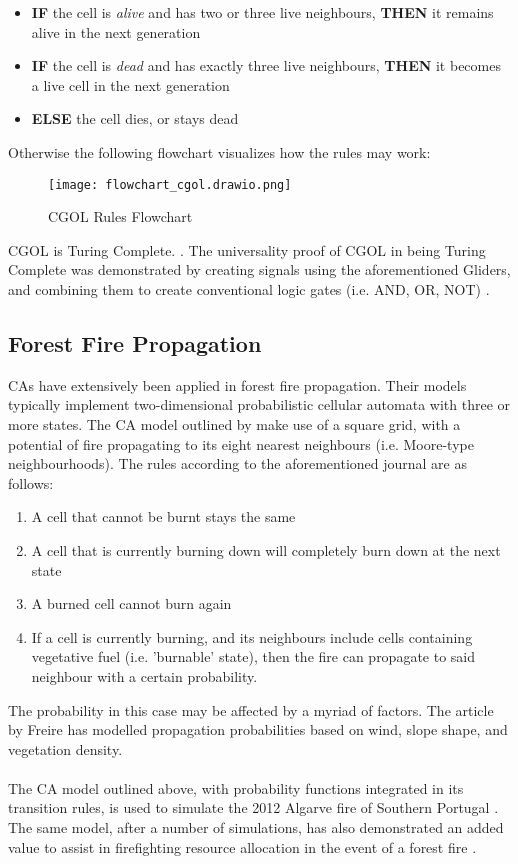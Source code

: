 \begin{itemize}
    \item \textbf{IF} the cell is \textit{alive} and has two or three live neighbours, \textbf{THEN} it remains alive in the next generation
    \item \textbf{IF} the cell is \textit{dead} and has exactly three live neighbours, \textbf{THEN} it becomes a live cell in the next generation
    \item \textbf{ELSE} the cell dies, or stays dead
\end{itemize}
Otherwise the following flowchart visualizes how the rules may work:
\begin{figure}[H]
    \caption{CGOL Rules Flowchart}
    \centering
    \texttt{[image: flowchart\_cgol.drawio.png]}
\end{figure}
\noindent CGOL is Turing Complete. \cite{rendell2010simple}. The universality proof of CGOL in being Turing Complete was demonstrated by creating signals using the aforementioned Gliders, and combining them to create conventional logic gates (i.e. AND, OR, NOT) \cite{rendell2002turing}. 

\subsection{Forest Fire Propagation}
CAs have extensively been applied in forest fire propagation. Their models typically implement two-dimensional probabilistic cellular automata with three or more states. The CA model outlined by \cite{alexandridis_2011} make use of a square grid, with a potential of fire propagating to its eight nearest neighbours (i.e. Moore-type neighbourhoods). The rules according to the aforementioned journal are as follows:
\begin{enumerate}
    \item A cell that cannot be burnt stays the same
    \item A cell that is currently burning down will completely burn down at the next state
    \item A burned cell cannot burn again
    \item If a cell is currently burning, and its neighbours include cells containing vegetative fuel (i.e. 'burnable' state), then the fire can propagate to said neighbour with a certain probability. 
\end{enumerate}
The probability in this case may be affected by a myriad of factors. The article by Freire \cite{freire} has modelled propagation probabilities based on wind, slope shape, and vegetation density. 
\\ \\
The CA model outlined above, with probability functions integrated in its transition rules, is used to simulate the 2012 Algarve fire of Southern Portugal \cite{freire}. The same model, after a number of simulations, has also demonstrated an added value to assist in firefighting resource allocation in the event of a forest fire \cite{freire}.

